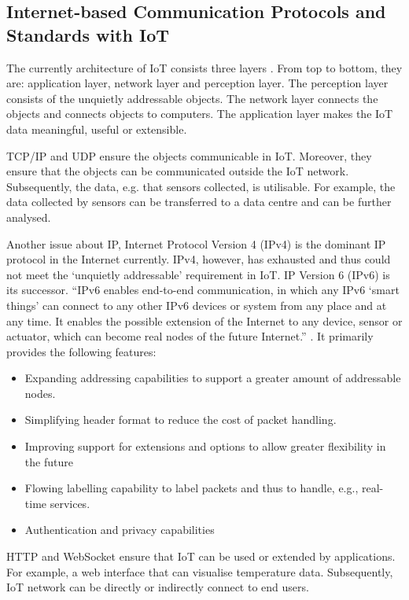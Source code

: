 \subsection{Internet-based Communication Protocols and Standards with IoT}
The currently architecture of IoT consists three layers \cite{wu2010research}. From top to bottom, they are: application layer, network layer and perception layer. The perception layer consists of the unquietly addressable objects. The network layer connects the objects and connects objects to computers. The application layer makes the IoT data meaningful, useful or extensible.

TCP/IP and UDP ensure the objects communicable in IoT. Moreover, they ensure that the objects can be communicated outside the IoT network. Subsequently, the data, e.g. that sensors collected, is utilisable. For example, the data collected by sensors can be transferred to a data centre and can be further analysed. 

Another issue about IP, Internet Protocol Version 4 (IPv4) is the dominant IP protocol in the Internet currently. IPv4, however, has exhausted \cite{smith2011free} and thus could not meet the `unquietly addressable' requirement in IoT. IP Version 6 (IPv6) is its successor. ``IPv6 enables end-to-end communication, in which any IPv6 `smart things' can connect to any other IPv6 devices or system from any place and at any time. It enables the possible extension of the Internet to any device, sensor or actuator, which can become real nodes of the future Internet.'' \cite{vermesan2011internet}. It primarily provides the following features\cite{deering1998internet}: 

\begin{itemize}
\setlength{\itemsep}{0pt}
\item Expanding addressing capabilities to support a greater amount of addressable nodes. 
\item Simplifying header format to reduce the cost of packet handling.
\item Improving support for extensions and options to allow greater flexibility in the future
\item Flowing labelling capability to label packets and thus to handle, e.g., real-time services.
\item Authentication and privacy capabilities
\end{itemize}

HTTP and WebSocket ensure that IoT can be used or extended by applications. For example, a web interface that can visualise temperature data. Subsequently, IoT network can be directly or indirectly connect to end users. 
